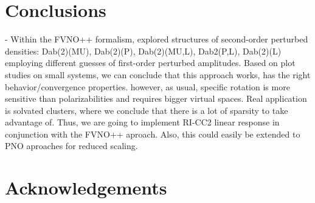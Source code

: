 \section{Conclusions}

- Within the FVNO++ formalism, explored 
structures of second-order perturbed densities:
Dab(2)(MU), Dab(2)(P), Dab(2)(MU,L), Dab2(P,L), Dab(2)(L) 
employing different guesses of first-order perturbed amplitudes.  
Based on plot studies on small systems, we can conclude that 
this approach works, has the right behavior/convergence properties.
however, as usual, specific rotation is more sensitive than
polarizabilities and requires bigger virtual spaces.
Real application is solvated clusters, where we conclude that
there is a lot of sparsity to take advantage of.
Thus, we are going to implement RI-CC2 linear response
in conjunction with the FVNO++ aproach.
Also, this could easily be extended to PNO aproaches for reduced scaling.

%
%
\section{Acknowledgements}
%

%
%
%
%
%
%
